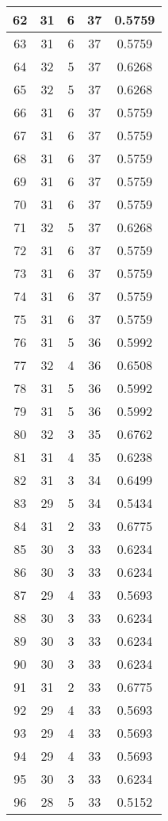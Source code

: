 \documentclass[letterpaper, 12pt]{article}
\begin{document}
\begin{longtable}{|c|c|c|c|c|}
\hline
62 & 31 & 6 & 37 & 0.5759 \\
\hline
63 & 31 & 6 & 37 & 0.5759 \\
\hline
64 & 32 & 5 & 37 & 0.6268 \\
\hline
65 & 32 & 5 & 37 & 0.6268 \\
\hline
66 & 31 & 6 & 37 & 0.5759 \\
\hline
67 & 31 & 6 & 37 & 0.5759 \\
\hline
68 & 31 & 6 & 37 & 0.5759 \\
\hline
69 & 31 & 6 & 37 & 0.5759 \\
\hline
70 & 31 & 6 & 37 & 0.5759 \\
\hline
71 & 32 & 5 & 37 & 0.6268 \\
\hline
72 & 31 & 6 & 37 & 0.5759 \\
\hline
73 & 31 & 6 & 37 & 0.5759 \\
\hline
74 & 31 & 6 & 37 & 0.5759 \\
\hline
75 & 31 & 6 & 37 & 0.5759 \\
\hline
76 & 31 & 5 & 36 & 0.5992 \\
\hline
77 & 32 & 4 & 36 & 0.6508 \\
\hline
78 & 31 & 5 & 36 & 0.5992 \\
\hline
79 & 31 & 5 & 36 & 0.5992 \\
\hline
80 & 32 & 3 & 35 & 0.6762 \\
\hline
81 & 31 & 4 & 35 & 0.6238 \\
\hline
82 & 31 & 3 & 34 & 0.6499 \\
\hline
83 & 29 & 5 & 34 & 0.5434 \\
\hline
84 & 31 & 2 & 33 & 0.6775 \\
\hline
85 & 30 & 3 & 33 & 0.6234 \\
\hline
86 & 30 & 3 & 33 & 0.6234 \\
\hline
87 & 29 & 4 & 33 & 0.5693 \\
\hline
88 & 30 & 3 & 33 & 0.6234 \\
\hline
89 & 30 & 3 & 33 & 0.6234 \\
\hline
90 & 30 & 3 & 33 & 0.6234 \\
\hline
91 & 31 & 2 & 33 & 0.6775 \\
\hline
92 & 29 & 4 & 33 & 0.5693 \\
\hline
93 & 29 & 4 & 33 & 0.5693 \\
\hline
94 & 29 & 4 & 33 & 0.5693 \\
\hline
95 & 30 & 3 & 33 & 0.6234 \\
\hline
96 & 28 & 5 & 33 & 0.5152 \\

\end{longtable}
\end{document}
